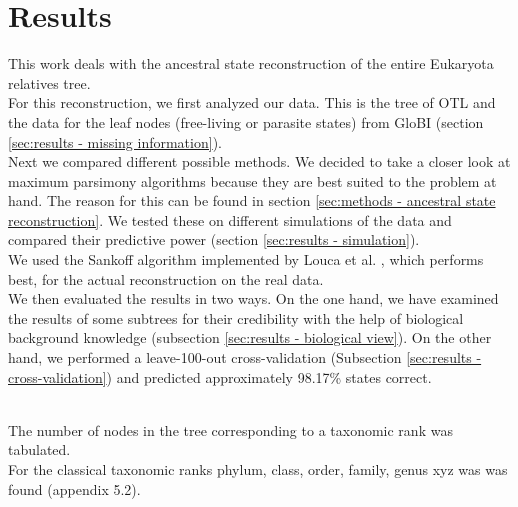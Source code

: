 \chapter{Results}
  This work deals with the ancestral state reconstruction of the entire Eukaryota relatives tree. \\

  For this reconstruction, we first analyzed our data. This is the tree of OTL \cite{Hinchliff2015}
    and the data for the leaf nodes (free-living or parasite states) from GloBI \cite{Poelen2014} 
    (section \ref{sec:results - missing information}). \\
  Next we compared different possible methods. We decided to take a closer look at maximum parsimony 
    algorithms because they are best suited to the problem at hand. The reason for this can be found 
    in section \ref{sec:methods - ancestral state reconstruction}. We tested these on different 
    simulations of the data and compared their predictive power (section 
    \ref{sec:results - simulation}). \\
  We used the Sankoff algorithm \cite{Sankoff1975} implemented by Louca et al. \cite{Louca2017}, 
    which performs best, for the actual reconstruction on the real data. \\

  We then evaluated the results in two ways. On the one hand, we have examined the results of some 
    subtrees for their credibility with the help of biological background knowledge (subsection 
    \ref{sec:results - biological view}). On the other hand, we performed a leave-100-out cross-validation
    (Subsection \ref{sec:results - cross-validation}) and predicted approximately 98.17\% states 
    correct.

  
 \\
The number of nodes in the tree corresponding to a taxonomic rank was tabulated. \\
For the classical taxonomic ranks phylum, class, order, family, genus xyz was was found (appendix 5.2).
   
